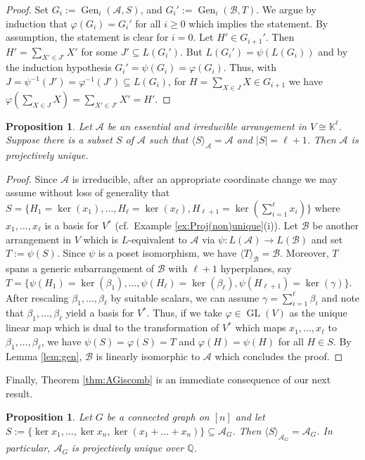 \documentclass[12pt]{amsart}
\newcommand\CA{{\mathscr A}}
\newcommand\CB{{\mathscr B}}
\newcommand\BBK{{\mathbb K}}
\newcommand\BBQ{{\mathbb Q}}
\newcommand\GL{\operatorname{GL}}
\newcommand\Gen{\operatorname{Gen}}
\numberwithin{equation}{section}
\theoremstyle{plain}
\newtheorem{prop}[equation]{Proposition}
\theoremstyle{definition}
\begin{document}
\begin{proof}
	Set $G_i := \Gen_i(\CA,S)$, and $G_i' := \Gen_i(\CB,T)$.
	We argue by induction that $\varphi(G_i) = G_i'$ for all $i\geq 0$ which implies the statement.
	By assumption, the statement is clear for $i=0$.
	Let $H' \in G_{i+1}'$. Then $H' = \sum_{X'\in J'}X'$ for some $J' \subseteq L(G_i')$.
	But $L(G_i') = \psi(L(G_i))$ and by the induction hypothesis $G_i' = \psi(G_i) = \varphi(G_i)$.
	Thus, with $J = \psi^{-1}(J') = \varphi^{-1}(J')  \subseteq L(G_i)$,
	for $H = \sum_{X \in J}X \in G_{i+1}$ we have $\varphi(\sum_{X\in J}X) = \sum_{X' \in J'}X' = H'$. 
\end{proof}

\begin{prop}
	\label{prop:gen}
	Let $\CA$ be an essential and irreducible arrangement in $V \cong \BBK^\ell$.
	Suppose there is a subset $S$ of $\CA$ such that $\langle S \rangle_\CA = \CA$ and $|S| = \ell+1$.
	Then $\CA$ is projectively unique.
\end{prop}
\begin{proof}
	Since $\CA$ is irreducible, after an appropriate coordinate change we may assume without loss of generality that $S = \{H_1=\ker(x_1),\ldots,H_\ell = \ker(x_\ell),H_{\ell+1}=\ker(\sum_{i=1}^\ell x_i)\}$
	where $x_1,\ldots,x_\ell$ is a basis for $V^*$ (cf.\ Example \ref{ex:Proj(non)unique}(i)).
	Let $\CB$ be another arrangement in $V$ which is $L$-equivalent to $\CA$ via $\psi:L(\CA)\to L(\CB)$ and set $T := \psi(S)$.
	Since $\psi$ is a poset isomorphism, we have $\langle T \rangle_\CB = \CB$.
	Moreover, $T$ spans a generic subarrangement of $\CB$ with $\ell+1$ hyperplanes, 
	say $T = \{\psi(H_1)= \ker(\beta_1),\ldots,\psi(H_\ell) = \ker(\beta_\ell),\psi(H_{\ell+1}) = \ker(\gamma)\}$.
	After rescaling $\beta_1,\ldots,\beta_\ell$ by suitable scalars, we can assume $\gamma=\sum_{i=1}^\ell\beta_i$
	and note that $\beta_1,\ldots,\beta_\ell$ yield a basis for $V^*$. Thus, if we take $\varphi \in \GL(V)$ 
	as the unique linear map which is dual to the transformation of $V^*$ which maps $x_1,\ldots,x_\ell$ to $\beta_1,\ldots,\beta_\ell$,
	we have $\psi(S) = \varphi(S) = T$ and $\varphi(H) = \psi(H)$ for all $H\in S$. 
	By Lemma \ref{lem:gen}, $\CB$ is linearly isomorphic to $\CA$ which concludes the proof.
\end{proof}

Finally, 
Theorem \ref{thm:AGiscomb} is an immediate consequence of our next result.

\begin{prop}
	\label{prop:genCSG}
	Let $G$ be a connected graph on $[n]$ and 
	let $S := \{\ker x_1, \ldots, \ker x_n, \ker(x_1 + \ldots + x_n)\} \subseteq \CA_G$. Then
	 $\langle S \rangle_{\CA_G} = \CA_G$.
	 In particular, $\CA_G$ is projectively unique over $\BBQ$.
\end{prop}
\end{document}
